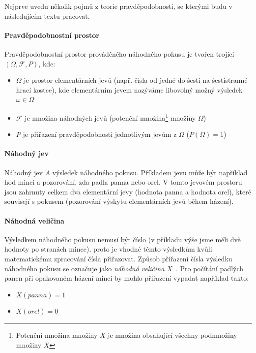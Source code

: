 \documentclass[thesis=M,czech]{FITthesis}[2014/05/07]
\begin{document}
Nejprve uvedu několik pojmů z teorie pravděpodobnosti, se kterými budu v následujícím textu pracovat.

\paragraph{Pravděpodobnostní prostor}

Pravděpodobnostní prostor prováděného náhodného pokusu je tvořen trojicí $(\Omega,\mathcal{F},P)$, kde:
	\begin{itemize}
		\item $\Omega$ je prostor elementárních jevů (např. čísla od jedné do šesti na šestistranné hrací kostce), kde elementárním jevem nazýváme libovolný možný výsledek $\omega \in \Omega$ 
		\item $\mathcal{F}$ je množina náhodných jevů (potenční množina\footnote{Potenční množina množiny $X$ je množina obsahující všechny podmnožiny množiny $X$} množiny $\Omega$)
		\item $P$ je přiřazení pravděpodobnosti jednotlivým jevům z $\Omega$ ($P(\Omega)=1$)
	\end{itemize}

\paragraph{Náhodný jev}
	
Náhodný jev $A$ výsledek náhodného pokusu. Příkladem jevu může být například hod mincí a pozorování, zda padla panna nebo orel. V tomto jevovém prostoru jsou zahrnuty celkem dva elementární jevy (hodnota panna a hodnota orel), které souvisejí s pokusem (pozorování výskytu elementárních jevů během házení).	

\paragraph{Náhodná veličina}
	\label{randomvel}
Výsledkem náhodného pokusu nemusí být číslo (v příkladu výše jsme měli dvě hodnoty po stranách mince), proto je vhodné těmto výsledkům kvůli matematickému zpracování čísla přiřazovat. Způsob přiřazení čísla výsledku náhodného pokusu se označuje jako \emph{náhodná veličina $X$}~\cite{pst1}. Pro počítání padlých panen při opakovaném házení mincí by mohlo přiřazení vypadat například takto:

\begin{itemize}
	\item $X(panna) = 1$
	\item $X(orel) = 0$
\end{itemize}
\end{document}
